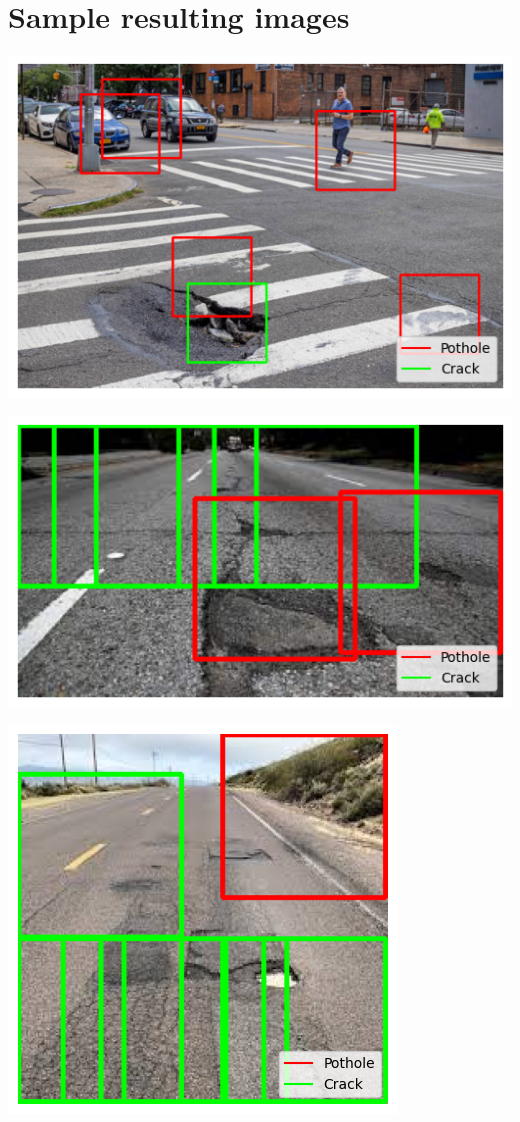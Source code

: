 \documentclass[12pt, letterpaper, twoside]{article}
\begin{document}
\section{Sample resulting images}
\label{app:result_image}

\includegraphics{result_1.png}

\includegraphics{result_2.png}

\includegraphics{result_3.png}
\end{document}
